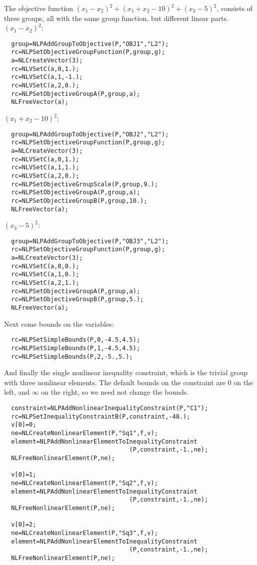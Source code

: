 \documentclass[12pt]{article}
\begin{document}
  The objective function $(x_1-x_2)^2+(x_1+x_2-10)^2+(x_3-5)^2$, consists 
  of three groups, all with the same group function, but different linear
  parts. $(x_1-x_2)^2$:
\begin{verbatim}
  group=NLPAddGroupToObjective(P,"OBJ1","L2");
  rc=NLPSetObjectiveGroupFunction(P,group,g);
  a=NLCreateVector(3);
  rc=NLVSetC(a,0,1.);
  rc=NLVSetC(a,1,-1.);
  rc=NLVSetC(a,2,0.);
  rc=NLPSetObjectiveGroupA(P,group,a);
  NLFreeVector(a);
\end{verbatim}
  $(x_1+x_2-10)^2$:
\begin{verbatim}
  group=NLPAddGroupToObjective(P,"OBJ2","L2");
  rc=NLPSetObjectiveGroupFunction(P,group,g);
  a=NLCreateVector(3);
  rc=NLVSetC(a,0,1.);
  rc=NLVSetC(a,1,1.);
  rc=NLVSetC(a,2,0.);
  rc=NLPSetObjectiveGroupScale(P,group,9.);
  rc=NLPSetObjectiveGroupA(P,group,a);
  rc=NLPSetObjectiveGroupB(P,group,10.);
  NLFreeVector(a);
\end{verbatim}
  $(x_3-5)^2$:
\begin{verbatim}
  group=NLPAddGroupToObjective(P,"OBJ3","L2");
  rc=NLPSetObjectiveGroupFunction(P,group,g);
  a=NLCreateVector(3);
  rc=NLVSetC(a,0,0.);
  rc=NLVSetC(a,1,0.);
  rc=NLVSetC(a,2,1.);
  rc=NLPSetObjectiveGroupA(P,group,a);
  rc=NLPSetObjectiveGroupB(P,group,5.);
  NLFreeVector(a);
\end{verbatim}

  Next come bounds on the variables:
\begin{verbatim}
  rc=NLPSetSimpleBounds(P,0,-4.5,4.5);
  rc=NLPSetSimpleBounds(P,1,-4.5,4.5);
  rc=NLPSetSimpleBounds(P,2,-5.,5.);
\end{verbatim}
 And finally the single nonlinear inequality constraint, which is the 
 trivial group with three nonlinear elements. The default bounds on the
 constraint are 0 on the left, and $\infty$ on the right, so we need not
 change the bounds.
\begin{verbatim}
  constraint=NLPAddNonlinearInequalityConstraint(P,"C1");
  rc=NLPSetInequalityConstraintB(P,constraint,-48.);
  v[0]=0;
  ne=NLCreateNonlinearElement(P,"Sq1",f,v);
  element=NLPAddNonlinearElementToInequalityConstraint
                                   (P,constraint,-1.,ne);
  NLFreeNonlinearElement(P,ne);

  v[0]=1;
  ne=NLCreateNonlinearElement(P,"Sq2",f,v);
  element=NLPAddNonlinearElementToInequalityConstraint
                                   (P,constraint,-1.,ne);
  NLFreeNonlinearElement(P,ne);

  v[0]=2;
  ne=NLCreateNonlinearElement(P,"Sq3",f,v);
  element=NLPAddNonlinearElementToInequalityConstraint
                                   (P,constraint,-1.,ne);
  NLFreeNonlinearElement(P,ne);
\end{verbatim}
\end{document}
